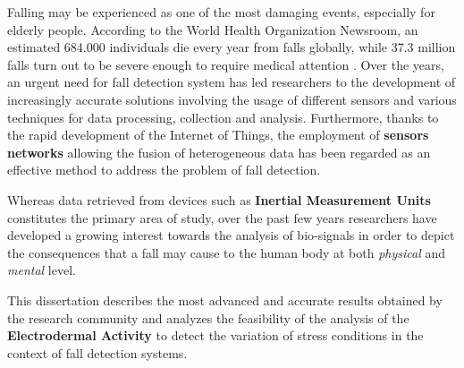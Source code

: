 \label{ch:introduction}

Falling may be experienced as one of the most damaging events, especially for elderly people. According to the World Health Organization Newsroom, an estimated 684.000 individuals die every year from falls globally, while 37.3 million falls turn out to be severe enough to require medical attention \cite{WhoData}. 
Over the years, an urgent need for fall detection system has led researchers to the development of increasingly accurate solutions involving the usage of different sensors and various techniques for data processing, collection and analysis.
Furthermore, thanks to the rapid development of the Internet of Things, the employment of \textbf{sensors networks} allowing the fusion of heterogeneous data has been regarded as an effective method to address the problem of fall detection.

Whereas data retrieved from devices such as \textbf{Inertial Measurement Units} constitutes the primary area of study, over the past few years researchers have developed a growing interest towards the analysis of bio-signals in order to depict the consequences that a fall may cause to the human body at both \textit{physical} and \textit{mental} level.

This dissertation describes the most advanced and accurate results obtained by the research community and analyzes the feasibility of the analysis of the \textbf{Electrodermal Activity} to detect the variation of stress conditions in the context of fall detection systems. 

